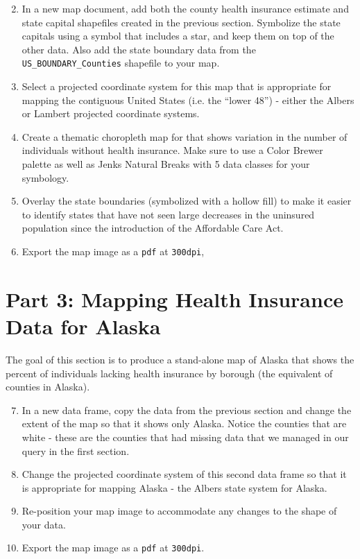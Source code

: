 \documentclass{tufte-handout}
\begin{document}
\begin{enumerate}
\setcounter{enumi}{1}
\item In a new map document, add both the county health insurance estimate and state capital shapefiles created in the previous section. Symbolize the state capitals using a symbol that includes a star, and keep them on top of the other data. Also add the state boundary data from the \texttt{US\_BOUNDARY\_Counties} shapefile to your map.
\item Select a projected coordinate system for this map that is appropriate for mapping the contiguous United States (i.e. the ``lower 48'') - either the Albers or Lambert projected coordinate systems.
\item Create a thematic choropleth map for that shows variation in the number of individuals without health insurance. Make sure to use a Color Brewer palette as well as Jenks Natural Breaks with 5 data classes for your symbology.
\item Overlay the state boundaries (symbolized with a hollow fill) to make it easier to identify states that have not seen large decreases in the uninsured population since the introduction of the Affordable Care Act.
\item Export the map image as a \texttt{pdf} at \texttt{300dpi},
\end{enumerate}

\vspace{5mm}
\section{Part 3: Mapping Health Insurance Data for Alaska}
The goal of this section is to produce a stand-alone map of Alaska that shows the percent of individuals lacking health insurance by borough (the equivalent of counties in Alaska).

\begin{enumerate}
\setcounter{enumi}{6}
\item In a new data frame, copy the data from the previous section and change the extent of the map so that it shows only Alaska. Notice the counties that are white - these are the counties that had missing data that we managed in our query in the first section.
\item Change the projected coordinate system of this second data frame so that it is appropriate for mapping Alaska - the Albers state system for Alaska.
\item Re-position your map image to accommodate any changes to the shape of your data.
\item Export the map image as a \texttt{pdf} at \texttt{300dpi}.
\end{enumerate}
\end{document}

